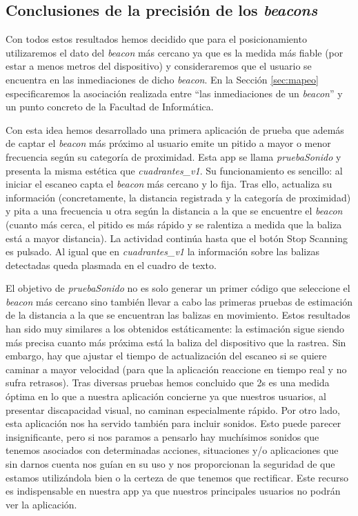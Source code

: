 \subsection{Conclusiones de la precisión de los \textit{beacons}}
\label{sub:conclusiones_posicionam}
Con todos estos resultados hemos decidido que para el posicionamiento utilizaremos el dato del \textit{beacon} más cercano ya que es la medida más fiable (por estar a menos metros del dispositivo) y consideraremos que el usuario se encuentra en las inmediaciones de dicho \textit{beacon}. En la Sección \ref{sec:mapeo} especificaremos la asociación realizada entre ``las inmediaciones de un \textit{beacon}'' y un punto concreto de la Facultad de Informática.

Con esta idea hemos desarrollado una primera aplicación de prueba que además de captar el \textit{beacon} más próximo al usuario emite un pitido a mayor o menor frecuencia según su categoría de proximidad. Esta app se llama \textit{pruebaSonido} y presenta la misma estética que \textit{cuadrantes\_v1}. Su funcionamiento es sencillo: al iniciar el escaneo capta el \textit{beacon} más cercano y lo fija. Tras ello, actualiza su información (concretamente, la distancia registrada y la categoría de proximidad) y pita a una frecuencia u otra según la distancia a la que se encuentre el \textit{beacon} (cuanto más cerca, el pitido es más rápido y se ralentiza a medida que la baliza está a mayor distancia). La actividad continúa hasta que el botón Stop Scanning es pulsado. Al igual que en \textit{cuadrantes\_v1} la información sobre las balizas detectadas queda plasmada en el cuadro de texto.

El objetivo de \textit{pruebaSonido} no es solo generar un primer código que seleccione el \textit{beacon} más cercano sino también llevar a cabo las primeras pruebas de estimación de la distancia a la que se encuentran las balizas en movimiento. Estos resultados han sido muy similares a los obtenidos estáticamente: la estimación sigue siendo más precisa cuanto más próxima está la baliza del dispositivo que la rastrea. Sin embargo, hay que ajustar el tiempo de actualización del escaneo si se quiere caminar a mayor velocidad (para que la aplicación reaccione en tiempo real y no sufra retrasos). Tras diversas pruebas hemos concluido que 2s es una medida óptima en lo que a nuestra aplicación concierne ya que nuestros usuarios, al presentar discapacidad visual, no caminan especialmente rápido. Por otro lado, esta aplicación nos ha servido también para incluir sonidos. Esto puede parecer insignificante, pero si nos paramos a pensarlo hay muchísimos sonidos que tenemos asociados con determinadas acciones, situaciones y/o aplicaciones que sin darnos cuenta nos guían en su uso y nos proporcionan la seguridad de que estamos utilizándola bien o la certeza de que tenemos que rectificar. Este recurso es indispensable en nuestra app ya que nuestros principales usuarios no podrán ver la aplicación.


